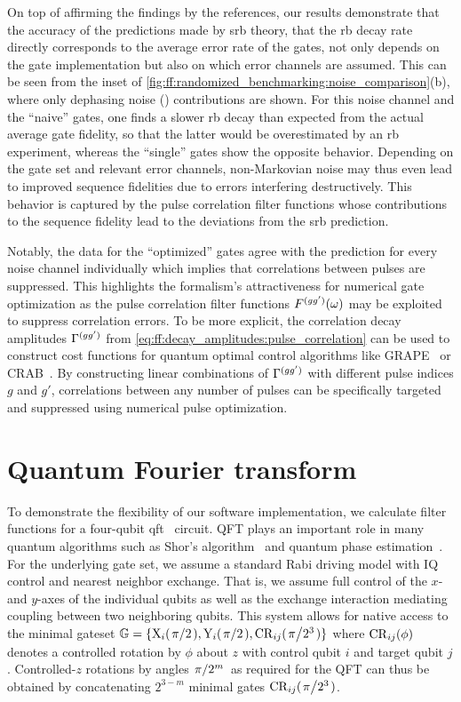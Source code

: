 On top of affirming the findings by the references, our results demonstrate that the accuracy of the predictions made by \gls{srb} theory, \ie that the \gls{rb} decay rate directly corresponds to the average error rate of the gates, not only depends on the gate implementation but also on which error channels are assumed.
This can be seen from the inset of \cref{fig:ff:randomized_benchmarking:noise_comparison}(b), where only dephasing noise (\pz) contributions are shown.
For this noise channel and the \enquote{naive} gates, one finds a slower \gls{rb} decay than expected from the actual average gate fidelity, so that the latter would be overestimated by an \gls{rb} experiment, whereas the \enquote{single} gates show the opposite behavior.
Depending on the gate set and relevant error channels, non-Markovian noise may thus even lead to improved sequence fidelities due to errors interfering destructively.
This behavior is captured by the pulse correlation filter functions whose contributions to the sequence fidelity lead to the deviations from the \gls{srb} prediction.

Notably, the data for the \enquote{optimized} gates agree with the prediction for every noise channel individually which implies that correlations between pulses are suppressed.
This highlights the formalism's attractiveness for numerical gate optimization as the pulse correlation filter functions $F^{(gg')}(\omega)$ may be exploited to suppress correlation errors.
To be more explicit, the correlation decay amplitudes $\Gamma^{(gg')}$ from \cref{eq:ff:decay_amplitudes:pulse_correlation} can be used to construct cost functions for quantum optimal control algorithms like GRAPE~\cite{Khaneja2005,Schulte-Herbruggen2005} or CRAB~\cite{Caneva2011}.
By constructing linear combinations of $\Gamma^{(gg')}$ with different pulse indices $g$ and $g'$, correlations between any number of pulses can be specifically targeted and suppressed using numerical pulse optimization.

\section{Quantum Fourier transform}\label{sec:ff:examples:qft}
To demonstrate the flexibility of our software implementation, we calculate filter functions for a four-qubit \acrfull{qft}~\cite{Coppersmith1994,Nielsen2011} circuit.
QFT plays an important role in many quantum algorithms such as Shor's algorithm~\cite{Shor1997} and quantum phase estimation~\cite{Nielsen2011}.
For the underlying gate set, we assume a standard Rabi driving model with IQ control and nearest neighbor exchange.
That is, we assume full control of the $x$- and $y$-axes of the individual qubits as well as the exchange interaction mediating coupling between two neighboring qubits.
This system allows for native access to the minimal gateset $\mathbb{G} = \lbrace\mr{X}_{i}(\flatfrac{\pi}{2}),\mr{Y}_{i}(\flatfrac{\pi}{2}),\mr{CR}_{ij}(\flatfrac{\pi}{2^3})\rbrace$ where $\mathrm{CR}_{ij}(\phi)$ denotes a controlled rotation by $\phi$ about $z$ with control qubit $i$ and target qubit $j$.
Controlled-$z$ rotations by angles $\flatfrac{\pi}{2^m}$ as required for the QFT can thus be obtained by concatenating $2^{3-m}$ minimal gates $\mr{CR}_{ij}(\flatfrac{\pi}{2^3})$.

